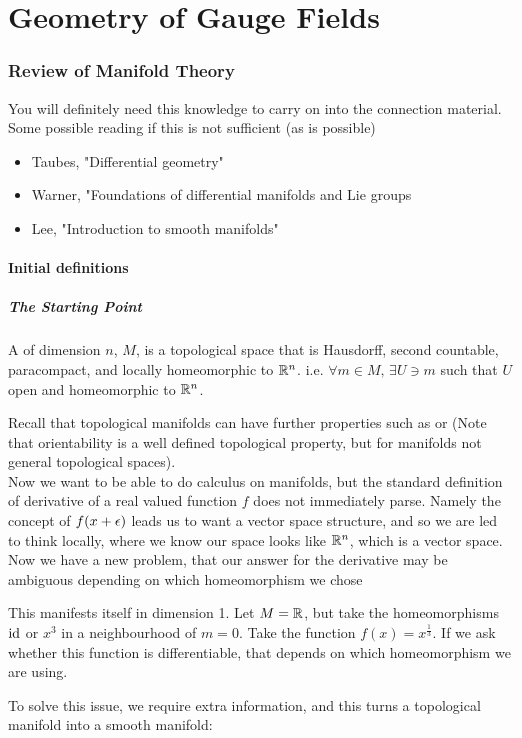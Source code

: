 \documentclass{article}
\begin{document}
\part{Geometry of Gauge Fields}

\section{Review of Manifold Theory}
You will definitely need this knowledge to carry on into the connection material. Some possible reading if this is not sufficient (as is possible)
\begin{itemize}
	\item Taubes, "Differential geometry"
	\item Warner, "Foundations of differential manifolds and Lie groups
	\item Lee, "Introduction to smooth manifolds"
\end{itemize}
\subsection{Initial definitions}
\subsubsection{The Starting Point}
\begin{definition}
A  of dimension $n$, $M$, is a topological space that is Hausdorff, second countable, paracompact, and locally homeomorphic to $\mathbb{R}^n$. i.e. $\forall m \in M, \, \exists U \ni m$ such that $U$ open and homeomorphic to $\mathbb{R}^n$. 
\end{definition}
Recall that topological manifolds can have further properties such as  or  (Note that orientability is a well defined topological property, but for manifolds not general topological spaces). \\
Now we want to be able to do calculus on manifolds, but the standard definition of derivative of a real valued function $f$ does not immediately parse. Namely the concept of $f(x+\epsilon)$ leads us to want a vector space structure, and so we are led to think locally, where we know our space looks like $\mathbb{R}^n$, which is a vector space. Now we have a new problem, that our answer for the derivative may be ambiguous depending on which homeomorphism we chose 
\begin{example}
This manifests itself in dimension 1. Let $M = \mathbb{R}$, but take the homeomorphisms $\operatorname{id}$ or $x^3$ in a neighbourhood of $m=0$. Take the function $f(x) = x^\frac{1}{3}$. If we ask whether this function is differentiable, that depends on which homeomorphism we are using. 
\end{example}
To solve this issue, we require extra information, and this turns a topological manifold into a smooth manifold:
\end{document}
